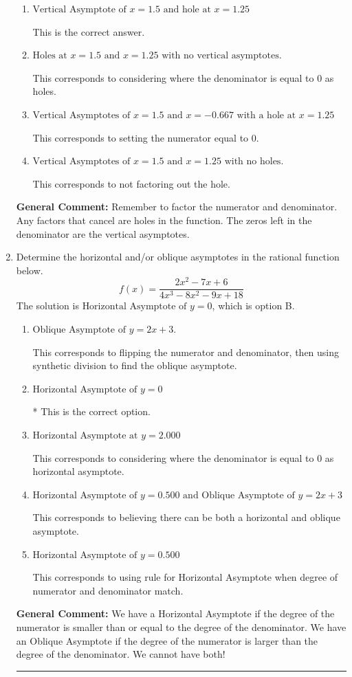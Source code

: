 \documentclass{extbook}[14pt]
\newcommand{\litem}[1]{\item #1

\rule{\textwidth}{0.4pt}}
\begin{document}
\begin{enumerate}
{\begin{enumerate}[label=\Alph*.]
This corresponds to mixing vertical and horizontal asymptotes.
\item \( \text{Vertical Asymptote of } x = 1.5 \text{ and hole at } x = 1.25 \)

This is the correct answer.
\item \( \text{Holes at } x = 1.5 \text{ and } x = 1.25 \text{ with no vertical asymptotes.} \)

This corresponds to considering where the denominator is equal to 0 as holes.
\item \( \text{Vertical Asymptotes of } x = 1.5 \text{ and } x = -0.667 \text{ with a hole at } x = 1.25 \)

This corresponds to setting the numerator equal to 0.
\item \( \text{Vertical Asymptotes of } x = 1.5 \text{ and } x = 1.25 \text{ with no holes.} \)

This corresponds to not factoring out the hole.
\end{enumerate}

\textbf{General Comment:} Remember to factor the numerator and denominator. Any factors that cancel are holes in the function. The zeros left in the denominator are the vertical asymptotes.
}
\litem{
Determine the horizontal and/or oblique asymptotes in the rational function below.
\[ f(x) = \frac{2x^{2} -7 x + 6}{4x^{3} -8 x^{2} -9 x + 18} \]The solution is \( \text{Horizontal Asymptote of } y = 0 \), which is option B.\begin{enumerate}[label=\Alph*.]
\item \( \text{Oblique Asymptote of } y = 2x + 3. \)

This corresponds to flipping the numerator and denominator, then using synthetic division to find the oblique asymptote.
\item \( \text{Horizontal Asymptote of } y = 0 \)

* This is the correct option.
\item \( \text{Horizontal Asymptote at } y = 2.000 \)

This corresponds to considering where the denominator is equal to 0 as horizontal asymptote.
\item \( \text{Horizontal Asymptote of } y = 0.500 \text{ and Oblique Asymptote of } y = 2x + 3 \)

This corresponds to believing there can be both a horizontal and oblique asymptote.
\item \( \text{Horizontal Asymptote of } y = 0.500  \)

This corresponds to using rule for Horizontal Asymptote when degree of numerator and denominator match.
\end{enumerate}

\textbf{General Comment:} We have a Horizontal Asymptote if the degree of the numerator is smaller than or equal to the degree of the denominator. We have an Oblique Asymptote if the degree of the numerator is larger than the degree of the denominator. We cannot have both!
}
\end{enumerate}
\end{document}
